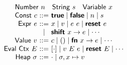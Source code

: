$$
\begin{array}{r@{\ }c@{\ }l}
\multicolumn{3}{c}{\mathsf{Number}\ n \quad \mathsf{String}\ s \quad \mathsf{Variable}\ x} \\
\mathsf{Const}\ c      & ::=  & \mathbfsf{true} \mid \mathbfsf{false} \mid n \mid s \\
\mathsf{Expr}\ e       & ::=  & x \mid v \mid e\ \many{e} \mid \mathbfsf{reset}\ e \\
                       & \mid & \mathbfsf{shift}\ x \to e \mid \cdots \\
\mathsf{Value}\ v      & ::=  & c \mid () \mid \mathbfsf{fn}\ \many{x} \to e \mid \cdots \\
\mathsf{Eval\ Ctx}\ E  & ::=  & [\cdot] \mid \many{v}\ E\ \many{e} \mid \mathbfsf{reset}\ E \mid \cdots \\
\mathsf{Heap}\ \sigma  & ::=  & \cdot \mid \sigma, x \mapsto v
\end{array}
$$
